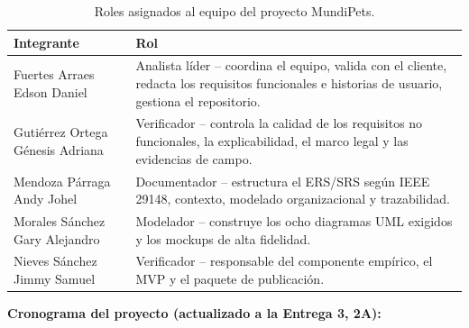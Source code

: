 \documentclass[journal,onecolumn]{IEEEtran}
\begin{document}
	\begin{table}[H]
		\caption{Roles asignados al equipo del proyecto MundiPets.}
		\centering
		\begin{tabularx}{\linewidth}{|X|X|}
			\hline
			\textbf{Integrante} & \textbf{Rol} \\
			\hline
			Fuertes Arraes Edson Daniel & Analista líder -- coordina el equipo, valida con el cliente, redacta los requisitos funcionales e historias de usuario, gestiona el repositorio. \\
			\hline
			Gutiérrez Ortega Génesis Adriana & Verificador -- controla la calidad de los requisitos no funcionales, la explicabilidad, el marco legal y las evidencias de campo. \\
			\hline
			Mendoza Párraga Andy Johel & Documentador -- estructura el ERS/SRS según IEEE 29148, contexto, modelado organizacional y trazabilidad. \\
			\hline
			Morales Sánchez Gary Alejandro & Modelador -- construye los ocho diagramas UML exigidos y los mockups de alta fidelidad. \\
			\hline
			Nieves Sánchez Jimmy Samuel & Verificador -- responsable del componente empírico, el MVP y el paquete de publicación. \\
			\hline
		\end{tabularx}
	\end{table}
	
	\textbf{Cronograma del proyecto (actualizado a la Entrega 3, 2A):}
	
\end{document}
